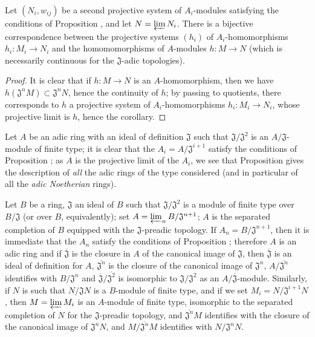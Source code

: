 \begin{corollary}[7.2.10]
\label{0.7.2.10}
Let $(N_i,w_{ij})$ be a second projective system of $A_i$-modules satisfying the conditions
of Proposition , and let $N=\varprojlim N_i$. There is a
bijective correspondence between the projective systems $(h_i)$ of $A_i$-homomorphisms
$h_i:M_i\to N_i$ and the homomomorphisms of $A$-modules $h:M\to N$ (which is necessarily
continuous for the $\mathfrak{J}$-adic topologies).
\end{corollary}

\begin{proof}
\label{proof-0.7.2.10}
It is clear that if $h:M\to N$ is an $A$-homomorphism, then we have
$h(\mathfrak{J}^n M)\subset\mathfrak{J}^n N$, hence the continuity of $h$; by passing to
quotients, there corresponds to $h$ a projective system of $A_i$-homomorphisms
$h_i:M_i\to N_i$, whose projective limit is $h$, hence the corollary.
\end{proof}

\begin{remark}[7.2.11]
\label{0.7.2.11}
Let $A$ be an adic ring with an ideal of definition $\mathfrak{J}$ such that
$\mathfrak{J}/\mathfrak{J}^2$ is an $A/\mathfrak{J}$-module of finite type; it is clear
that the $A_i=A/\mathfrak{J}^{i+1}$ satisfy
the conditions of Proposition ; as $A$ is the projective
limit of the $A_i$, we see that Proposition  gives the
description of \emph{all} the adic rings of the type considered (and in particular of all
the \emph{adic Noetherian} rings).
\end{remark}

\begin{example}[7.2.12]
\label{0.7.2.12}
Let $B$ be a ring, $\mathfrak{J}$ an ideal of $B$ such that $\mathfrak{J}/\mathfrak{J}^2$ is
a module of finite type over $B/\mathfrak{J}$ (or over $B$, equivalently); set
$A=\varprojlim_n B/\mathfrak{J}^{n+1}$; $A$ is the separated completion of $B$ equipped with
the $\mathfrak{J}$-preadic topology. If $A_n=B/\mathfrak{J}^{n+1}$, then it is immediate
that the $A_n$ satisfy the conditions of Proposition ;
therefore $A$ is an adic ring and if $\overline{\mathfrak{J}}$ is the closure in $A$ of the
canonical image of $\mathfrak{J}$, then $\overline{\mathfrak{J}}$ is an ideal of definition
for $A$, $\overline{\mathfrak{J}^n}$ is the closure of the canonical image of
$\mathfrak{J}^n$, $A/\overline{\mathfrak{J}^n}$ identifies with $B/\mathfrak{J}^n$ and
$\overline{\mathfrak{J}}/\overline{\mathfrak{J}^2}$ is isomorphic to
$\mathfrak{J}/\mathfrak{J}^2$ as an $A/\overline{\mathfrak{J}}$-module. Similarly, if $N$
is such that $N/\mathfrak{J}N$ is a $B$-module of finite type, and if we set
$M_i=N/\mathfrak{J}^{i+1}N$, then $M=\varprojlim M_i$ is an $A$-module of finite type,
isomorphic to the separated completion of $N$ for the $\mathfrak{J}$-preadic topology, and
$\overline{\mathfrak{J}^n}M$ identifies with the closure of the canonical image of
$\mathfrak{J}^n N$, and $M/\overline{\mathfrak{J}^n}M$ identifies with
$N/\mathfrak{J}^n N$.
\end{example}

